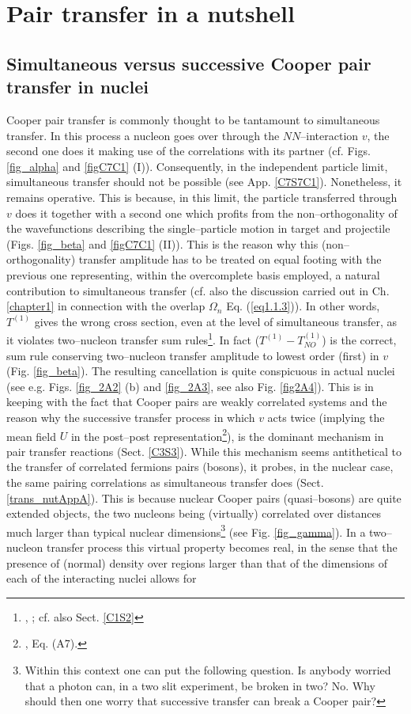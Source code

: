 \chapter[Simultaneous versus successive transfer]{Pair transfer in a nutshell}\label{chapter2}
\section{Simultaneous versus successive Cooper pair transfer in nuclei}\label{C2S1}
Cooper pair transfer is commonly thought to be tantamount to simultaneous transfer. In this process a nucleon goes over through the $NN$--interaction $v$, the second one does it making use of the correlations with its partner (cf. Figs. \ref{fig_alpha} and \ref{figC7C1} (I)). Consequently, in the independent particle limit, simultaneous  transfer should not be possible (see App. \ref{C7S7C1}). Nonetheless, it remains operative. This is because, in this limit, the particle transferred through $v$ does it together with a second one which profits from the non--orthogonality of the wavefunctions describing the single--particle motion in target and projectile (Figs. \ref{fig_beta} and \ref{figC7C1} (II)). This is the reason why this (non--orthogonality) transfer amplitude has to be treated on equal footing with  the previous one  representing, within the overcomplete basis employed, a natural contribution to simultaneous transfer (cf. also the discussion carried out in Ch.\ref{chapter1} in connection with the overlap $\Omega_n$ Eq. (\ref{eq1.1.3})). In other words, $T^{(1)}$ gives the wrong cross section, even at the level of simultaneous transfer, as it violates two--nucleon transfer sum rules\footnote{\cite{Broglia:72b}, \cite{Bayman:72}; cf. also Sect. \ref{C1S2}}. In fact ($T^{(1)}-T^{(1)}_{NO}$) is the correct, sum rule conserving two--nucleon transfer amplitude to lowest order (first) in $v$ (Fig. \ref{fig_beta}). The resulting cancellation is quite conspicuous in actual nuclei  (see e.g. Figs. \ref{fig_2A2} (b) and \ref{fig_2A3}, see also Fig. \ref{fig2A4}). This is in keeping with the fact that Cooper pairs are weakly correlated systems and the reason why the successive transfer process in which $v$ acts twice (implying the mean field $U$ in the post--post representation\footnote{\cite{Potel:13}, Eq. (A7).}), is the dominant mechanism in pair transfer reactions (Sect. \ref{C3S3}). While this mechanism seems antithetical to the transfer of  correlated fermions pairs (bosons), it probes, in the nuclear case, the same pairing correlations as simultaneous transfer does (Sect. \ref{trans_nutAppA}). This is because nuclear Cooper pairs (quasi--bosons) are quite extended objects, the two nucleons being (virtually) correlated over distances much larger than typical nuclear dimensions\footnote{Within this context one can put the following question. Is anybody worried that a photon can, in a two slit experiment, be broken in two? No. Why should then one worry that successive transfer can break a Cooper pair?} (see Fig. \ref{fig_gamma}). In a two--nucleon transfer process this virtual property becomes real, in the sense that the presence of (normal) density over regions larger than that of the dimensions of each of the interacting nuclei allows for 